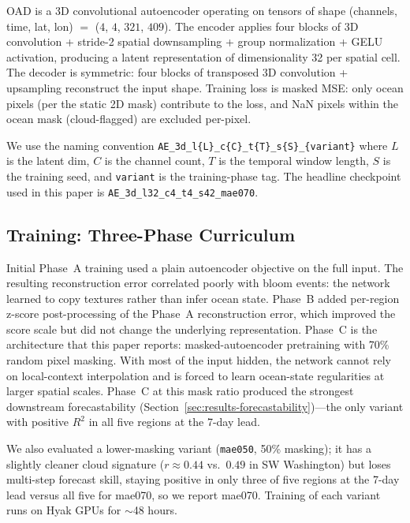 \documentclass[toxins,article,submit,moreauthors]{Definitions/mdpi}
\begin{document}
OAD is a 3D convolutional autoencoder operating on tensors of shape (channels, time, lat, lon) $=$ ($4$, $4$, $321$, $409$). The encoder applies four blocks of 3D convolution + stride-2 spatial downsampling + group normalization + GELU activation, producing a latent representation of dimensionality 32 per spatial cell. The decoder is symmetric: four blocks of transposed 3D convolution + upsampling reconstruct the input shape. Training loss is masked MSE: only ocean pixels (per the static 2D mask) contribute to the loss, and NaN pixels within the ocean mask (cloud-flagged) are excluded per-pixel.

We use the naming convention \texttt{AE\_3d\_l\{L\}\_c\{C\}\_t\{T\}\_s\{S\}\_\{variant\}} where $L$ is the latent dim, $C$ is the channel count, $T$ is the temporal window length, $S$ is the training seed, and \texttt{variant} is the training-phase tag. The headline checkpoint used in this paper is \texttt{AE\_3d\_l32\_c4\_t4\_s42\_mae070}.

\subsection{Training: Three-Phase Curriculum}

Initial Phase~A training used a plain autoencoder objective on the full input. The resulting reconstruction error correlated poorly with bloom events: the network learned to copy textures rather than infer ocean state. Phase~B added per-region z-score post-processing of the Phase~A reconstruction error, which improved the score scale but did not change the underlying representation. Phase~C is the architecture that this paper reports: masked-autoencoder pretraining \cite{He2022MAE} with 70\% random pixel masking. With most of the input hidden, the network cannot rely on local-context interpolation and is forced to learn ocean-state regularities at larger spatial scales. Phase~C at this mask ratio produced the strongest downstream forecastability (Section~\ref{sec:results-forecastability})---the only variant with positive $R^2$ in all five regions at the 7-day lead.

We also evaluated a lower-masking variant (\texttt{mae050}, 50\% masking); it has a slightly cleaner cloud signature ($r \approx 0.44$ vs.\ $0.49$ in SW Washington) but loses multi-step forecast skill, staying positive in only three of five regions at the 7-day lead versus all five for mae070, so we report mae070. Training of each variant runs on Hyak GPUs for $\sim$48 hours.
\end{document}
